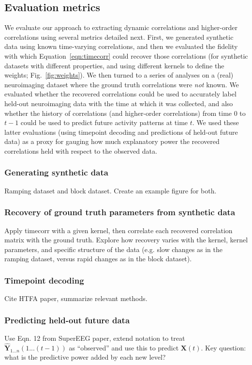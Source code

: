 \documentclass[english]{article}
\begin{document}
\subsection*{Evaluation metrics}
We evaluate our approach to extracting dynamic correlations and
higher-order correlations using several metrics detailed next.  First,
we generated synthetic data using known time-varying correlations, and
then we evaluated the fidelity with which Equation~\ref{eqn:timecorr}
could recover those correlations (for synthetic datasets with
different properties, and using different kernels to define the
weights; Fig.~\ref{fig:weights}).  We then turned to a series of
analyses on a (real) neuroimaging dataset where the ground truth
correlations were \textit{not} known.  We evaluated whether the
recovered correlations could be used to accurately label held-out
neuroimaging data with the time at which it was collected, and also
whether the history of correlations (and higher-order correlations)
from time 0 to $t-1$ could be used to predict future activity patterns
at time $t$.  We used these latter evaluations (using timepoint
decoding and predictions of held-out future data) as a proxy for
gauging how much explanatory power the recovered correlations held
with respect to the observed data.

\subsubsection*{Generating synthetic data}
Ramping dataset and block dataset.  Create an example figure for both.

\subsubsection*{Recovery of ground truth parameters from synthetic
  data}
Apply timecorr with a given kernel, then correlate each recovered
correlation matrix with the ground truth.  Explore how recovery varies
with the kernel, kernel parameters, and specific structure of the data
(e.g. slow changes as in the ramping dataset, versus rapid changes as
in the block dataset).

\subsubsection*{Timepoint decoding}
Cite HTFA paper, summarize relevant methods.

\subsubsection*{Predicting held-out future data}
Use Eqn. 12 from SuperEEG paper, extend notation to treat
$\hat{\mathbf{Y}}_{1...n}(1...(t-1))$ as ``observed'' and use this to
predict $\mathbf{X}(t)$.  Key question: what is the predictive power
added by each new level?
\end{document}
